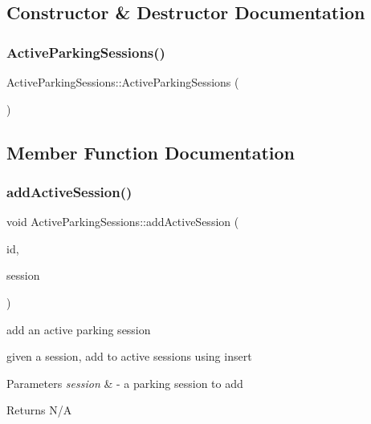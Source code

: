 \subsection{Constructor \& Destructor Documentation}
\mbox{\label{class_active_parking_sessions_aa79b38fd8ad784f12c431bd095d2b627}} 
\subsubsection{\texorpdfstring{Active\+Parking\+Sessions()}{ActiveParkingSessions()}}
{\footnotesize\ttfamily Active\+Parking\+Sessions\+::\+Active\+Parking\+Sessions (\begin{DoxyParamCaption}{ }\end{DoxyParamCaption})}



\subsection{Member Function Documentation}
\mbox{\label{class_active_parking_sessions_ab214d63838f6a97742241b5c0a9be651}} 
\subsubsection{\texorpdfstring{add\+Active\+Session()}{addActiveSession()}}
{\footnotesize\ttfamily void Active\+Parking\+Sessions\+::add\+Active\+Session (\begin{DoxyParamCaption}\item[{int}]{id,  }\item[{\mbox{\hyperlink{class_parking_session}{Parking\+Session}}}]{session }\end{DoxyParamCaption})}



add an active parking session 

given a session, add to active sessions using insert


\begin{DoxyParams}{Parameters}
{\em session} & -\/ a parking session to add \\
\hline
\end{DoxyParams}
\begin{DoxyReturn}{Returns}
N/A 
\end{DoxyReturn}
\mbox{\label{class_active_parking_sessions_a0f8c8e3d21629e9f0a325bdbb0f4ac87}} 
